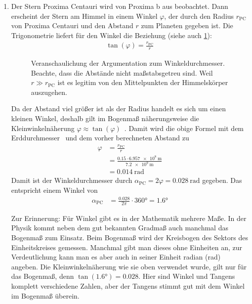 \begin{enumerate}
	\item Der Stern Proxima Centauri wird von Proxima b aus beobachtet. Dann erscheint der Stern am Himmel in einem Winkel $\varphi$, der durch den Radius $r_{\text{PC}}$ von Proxima Centauri und den Abstand $r$ zum Planeten gegeben ist. Die Trigonometrie liefert für den Winkel die Beziehung (siehe auch \cref{fig:Winkeldurchmesser}):
	\begin{align*}
		\tan(\varphi)=\frac{r_{\text{PC}}}{r}
	\end{align*}
	\begin{figure}
		\centering
		\caption{Veranschaulichung der Argumentation zum Winkeldurchmesser. Beachte, dass die Abstände nicht maßstabsgetreu sind. Weil $r\gg r_{\text{PC}}$ ist es legitim von den Mittelpunkten der Himmelskörper auszugehen.}
		\label{fig:Winkeldurchmesser}
	\end{figure}
	Da der Abstand viel größer ist als der Radius handelt es sich um einen kleinen Winkel, deshalb gilt im Bogenmaß näherungsweise die Kleinwinkelnäherung $\varphi\approx \tan(\varphi)$~\cite[S.28]{Cornelsen2013}. Damit wird die obige Formel mit dem Erddurchmesser~\cite[S.47]{Cornelsen2013} und dem vorher berechneten Abstand zu
	\begin{align*}
		\varphi &= \frac{r_{\text{PC}}}{r}\\
		&=\frac{\num{0.15}\cdot\SI{6.957e8}{\meter}}{\SI{7.2e9}{\meter}}\\
		&=\SI{0.014}{\radian}
	\end{align*}
	Damit ist der Winkeldurchmesser durch $\alpha_\text{{PC}}=2\varphi=\SI{0.028}{\radian}$ gegeben. Das entspricht einem Winkel von
	\begin{align*}
		\alpha_{\text{PC}}&=\frac{\num{0.028}}{2\pi}\cdot \ang{360}=\ang{1.6}
	\end{align*}

	\begin{hinweis}
		Zur Erinnerung: Für Winkel gibt es in der Mathematik mehrere Maße. In der Physik kommt neben dem gut bekannten Gradmaß auch manchmal das Bogenmaß zum Einsatz. Beim Bogenmaß wird der Kreisbogen des Sektors des Einheitskreises gemessen. Manchmal gibt man dieses ohne Einheiten an, zur Verdeutlichung kann man es aber auch in seiner Einheit radian (\unit{\radian}) angeben. Die Kleinwinkelnäherung wie sie oben verwendet wurde, gilt nur für das Bogenmaß, denn $\tan(\ang{1.6})=\num{0.028}$. Hier sind Winkel und Tangens komplett verschiedene Zahlen, aber der Tangens stimmt gut mit dem Winkel im Bogenmaß überein.
	\end{hinweis}


\end{enumerate}
